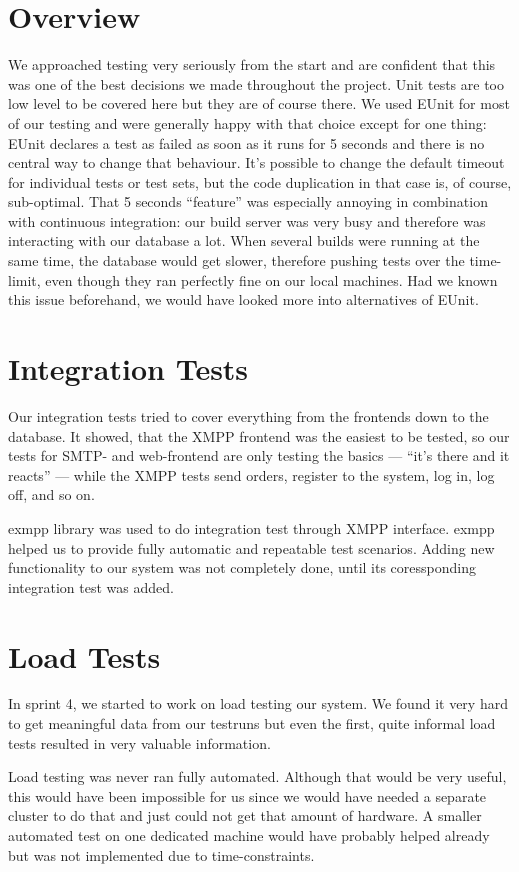 \documentclass[11pt,a4paper]{report}
\begin{document}
\section{Overview}
We approached testing very seriously from the start and are confident that this
was one of the best decisions we made throughout the project. Unit tests are too
low level to be covered here but they are of course there. We used EUnit for
most of our testing and were generally happy with that choice except for one
thing: EUnit declares a test as failed as soon as it runs for 5 seconds and
there is no central way to change that behaviour. It's possible to change the
default timeout for individual tests or test sets, but the code duplication in
that case is, of course, sub-optimal.
That 5 seconds ``feature'' was especially annoying in combination with
continuous integration: our build server was very busy and therefore was
interacting with our database a lot. When several builds were running at the
same time, the database would get slower, therefore pushing tests over the
time-limit, even though they ran perfectly fine on our local machines. Had we
known this issue beforehand, we would have looked more into alternatives of
EUnit.

\section{Integration Tests}
Our integration tests tried to cover everything from the frontends down to the
database. It showed, that the XMPP frontend was the easiest to be tested, so
our tests for SMTP- and web-frontend are only testing the basics --- ``it's
there and it reacts'' --- while the XMPP tests send orders, register to the
system, log in, log off, and so on.

exmpp library\cite{exmpp} was used to do integration test through XMPP interface.
exmpp helped us to provide fully automatic and repeatable test scenarios.
Adding new functionality to our system was not completely done, until its coressponding integration test was added.

\section{Load Tests}\label{load_tests}
In sprint 4, we started to work on load testing our system. We found it very
hard to get meaningful data from our testruns but even the first, quite informal
load tests resulted in very valuable information.

Load testing was never ran fully automated. Although that would be very useful,
this would have been impossible for us since we would have needed a separate
cluster to do that and just could not get that amount of hardware.
A smaller automated test on one dedicated machine would have probably helped
already but was not implemented due to time-constraints.
\end{document}
